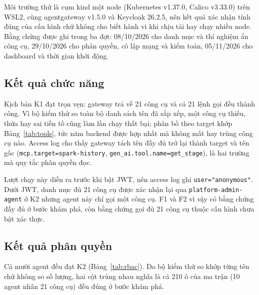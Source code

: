 Môi trường thử là cụm kind một node (Kubernetes v1.37.0, Calico v3.33.0) trên WSL2, cùng agentgateway v1.5.0 và Keycloak 26.2.5, nên kết quả xác nhận tính đúng của cấu hình chứ không cho biết hành vi khi chịu tải hay chạy nhiều node. Bằng chứng được ghi trong ba đợt: 08/10/2026 cho danh mục và thí nghiệm ẩn công cụ, 29/10/2026 cho phân quyền, cô lập mạng và kiểm toán, 05/11/2026 cho dashboard và thời gian khởi động.

\subsection{Kết quả chức năng}

Kịch bản K1 đạt trọn vẹn: gateway trả về 21 công cụ và cả 21 lệnh gọi đều thành công. Vì bộ kiểm thử so toàn bộ danh sách tên đã sắp xếp, một công cụ thiếu, thừa hay sai tiền tố cũng làm lần chạy thất bại; phân bố theo target khớp Bảng~\ref{tab:tools}, tức năm backend được hợp nhất mà không mất hay trùng công cụ nào. Access log cho thấy gateway tách tên đầy đủ trở lại thành target và tên gốc (\texttt{mcp.target=spark-history}, \texttt{gen\_ai.tool.name=get\_stage}), là hai trường mà quy tắc phân quyền đọc.

Lượt chạy này diễn ra trước khi bật JWT, nên access log ghi \texttt{user="anonymous"}. Dưới JWT, danh mục đủ 21 công cụ được xác nhận lại qua \texttt{platform-admin-agent} ở K2 nhưng agent này chỉ gọi một công cụ. F1 và F2 vì vậy có bằng chứng đầy đủ ở bước khám phá, còn bằng chứng gọi đủ 21 công cụ thuộc cấu hình chưa bật xác thực.

\subsection{Kết quả phân quyền}

Cả mười agent đều đạt K2 (Bảng~\ref{tab:rbac}). Do bộ kiểm thử so khớp từng tên chứ không so số lượng, hai cột trùng nhau nghĩa là cả 210 ô của ma trận (10 agent nhân 21 công cụ) đều đúng ở bước khám phá.

